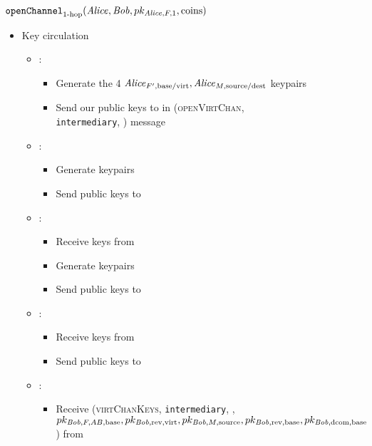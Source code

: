 \begin{figure}[H]
  \begin{protocolbox}{$\mathtt{openChannel}_{\text{1-hop}}(\mathit{Alice}, \mathit{Bob},
  pk_{\mathit{Alice}, F, 1}, \mathrm{coins})$}
    \begin{algorithmic}[1]
    \begin{itemize}
      \item Key circulation
      \begin{itemize}
        \item \alice:
        \begin{itemize}
          \item Generate the 4 $\mathit{Alice}_{F', \mathrm{base}/\mathrm{virt}}, \mathit{Alice}_{M,
          \mathrm{source}/\mathrm{dest}}$ keypairs
          \item Send our public keys to \bob in (\textsc{openVirtChan},
          \texttt{intermediary}, \charlie) message
        \end{itemize}
        \item \bob:
        \begin{itemize}
          \item Generate \TODO{} keypairs
          \item Send \TODO{} public keys to \charlie
        \end{itemize}
        \item \charlie:
        \begin{itemize}
          \item Receive \TODO{} keys from \bob
          \item Generate \TODO{} keypairs
          \item Send \TODO{} public keys to \bob
        \end{itemize}
        \item \bob:
        \begin{itemize}
          \item Receive \TODO{} keys from \charlie
          \item Send \TODO{} public keys to \alice
        \end{itemize}
        \item \alice:
        \begin{itemize}
          \item Receive (\textsc{virtChanKeys}, \texttt{intermediary}, \charlie,
          $pk_{\mathit{Bob}, F, AB, \mathrm{base}}, pk_{\mathit{Bob}, \mathrm{rev}, \mathrm{virt}},
          pk_{\mathit{Bob}, M, \mathrm{source}}, pk_{\mathit{Bob}, \mathrm{rev}, \mathrm{base}},
          pk_{\mathit{Bob}, \mathrm{dcom}, \mathrm{base}}$) from \bob

\end{itemize}
\end{itemize}
\end{itemize}
\end{algorithmic}
\end{protocolbox}
\end{figure}

